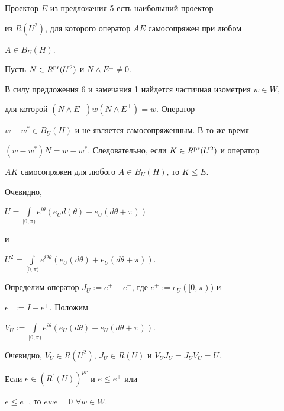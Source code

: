 \begin{cor}


Проектор $E$ из предложения 5 есть наибольший проектор


из $R(U^{2})$, для которого оператор $AE$ самосопряжен при любом


$A\in B_{U}(H)$.


\end{cor}





\begin{pf}


Пусть $N\in R^{\operatorname{pr}}(U^{2})$ и $N\wedge E^{\perp}\ne 0$.


В силу предложения 6 и замечания 1 найдется частичная изометрия $w\in W$,


для которой $(N\wedge E^{\perp})w(N\wedge E^{\perp})=w$. Оператор


$w-w^{*}\in B_{U}(H)$ и не является самосопряженным. В то же время


$(w-w^{*})N=w-w^{*}$. Следовательно, если $K\in


R^{\pr}(U^{2})$ и оператор


$AK$ самосопряжен для любого $A\in B_{U}(H)$, то $K\leq E$.


\end{pf}





Очевидно,


$U=\int\limits_{[0,\pi)}e^{i\theta}(e_{U}d(\theta)-e_{U}(d\theta +\pi))$


и


$U^{2}=\int\limits_{[0,\pi)}e^{i2\theta}(e_{U}(d\theta)+e_{U}(d\theta+\pi))$.


Определим оператор $J_{U}:=e^{+}-e^{-}$, где $e^{+}:=e_{U}([0,\pi))$ и


$e^{-}:=I-e^{+}$. Положим


$V_{U}:=\int\limits_{[0,\pi)}e^{i\theta}(e_{U}(d\theta)+e_{U}(d\theta+\pi))$.


Очевидно, $V_{U}\in R(U^{2})$, $J_{U}\in R(U)$ и $V_{U}J_{U}=J_{U}V_{U}=U$.





\begin{prop}


Если $e\in (R^{\prime}(U))^{pr}$ и $e\leq e^{+}$ или


$e\leq e^{-}$, то $ewe=0$ $\forall w\in W$.


\end{prop}





